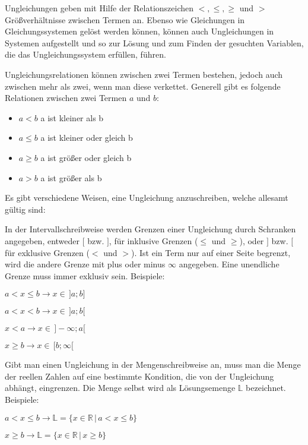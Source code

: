 



\thispagestyle{plain}


Ungleichungen geben mit Hilfe der Relationszeichen $<, \leq, \geq$ und $>$ Gr\"{o}\ss{}verh\"{a}ltnisse zwischen Termen an. Ebenso wie Gleichungen in Gleichungssystemen gel\"{o}st werden k\"{o}nnen, k\"{o}nnen auch Ungleichungen in Systemen aufgestellt und so zur L\"{o}sung und zum Finden der gesuchten Variablen, die das Ungleichungssystem erf\"{u}llen, f\"{u}hren.


Ungleichungsrelationen k\"{o}nnen zwischen zwei Termen bestehen, jedoch auch zwischen mehr als zwei, wenn man diese verkettet. Generell gibt es folgende Relationen zwischen zwei Termen $a$ und $b$:
\begin{itemize}
	\item $a < b$  a ist kleiner als b
	\item $a \leq b$  a ist kleiner oder gleich b
	\item $a \geq b$  a ist gr\"{o}\ss{}er oder gleich b
	\item $a > b$  a ist gr\"{o}\ss{}er als b
\end{itemize}


Es gibt verschiedene Weisen, eine Ungleichung anzuschreiben, welche allesamt g\"{u}ltig sind:


In der Intervallschreibweise werden Grenzen einer Ungleichung durch Schranken angegeben, entweder $[$ bzw. $]$, f\"{u}r inklusive Grenzen ($\leq$ und $\geq$), oder $]$ bzw. $[$ f\"{u}r exklusive Grenzen ($<$ und $>$). Ist ein Term nur auf einer Seite begrenzt, wird die andere Grenze mit plus oder minus $\infty$ angegeben. Eine unendliche Grenze muss immer exklusiv sein. Beispiele:
\begin{center}
	$a < x \leq b \rightarrow x \in \,]a;b]$

	$a < x < b \rightarrow x \in \,]a;b[$

	$x < a \rightarrow x \in \,]-\infty;a[$

	$x \geq b \rightarrow x \in \,[b;\infty[$
\end{center}


Gibt man einen Ungleichung in der Mengenschreibweise an, muss man die Menge der reellen Zahlen auf eine bestimmte Kondition, die von der Ungleichung abh\"{a}ngt, eingrenzen. Die Menge selbst wird als L\"{o}sungsemenge $\mathbb{L}$ bezeichnet. Beispiele:
\begin{center}
	$a < x \leq b \rightarrow \mathbb{L} = \{x \in \mathbb{R}\,|\,a < x \leq b\}$

	$x \geq b \rightarrow \mathbb{L} = \{x \in \mathbb{R}\,|\,x \geq b \}$
\end{center}

